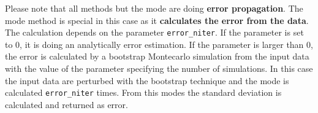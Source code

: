 Please note that all methods but the mode are doing \textbf{error
  propagation}. The mode method is special in this case as it
\textbf{calculates the error from the data}. The calculation depends
on the parameter \verb+error_niter+. If the parameter is set to 0, it
is doing an analytically error estimation. If the parameter is larger
than 0, the error is calculated by a bootstrap Montecarlo simulation
from the input data with the value of the parameter specifying the
number of simulations. In this case the input data are perturbed with
the bootstrap technique and the mode is calculated \verb+error_niter+
times. From this modes the standard deviation is calculated and
returned as error.

